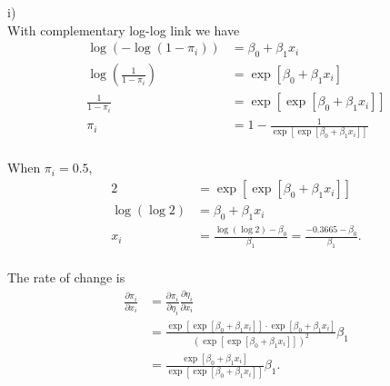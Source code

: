 \documentclass[a4paper]{article}
\begin{document}
i)\\
With complementary log-log link we have
\begin{align*}
\log\left(-\log(1-\pi_{i})\right) &= \beta_{0} + \beta_{1}x_{i}\\
\log\left(\frac{1}{1-\pi_{i}}\right) &= \exp\left[\beta_{0} + \beta_{1}x_{i}\right]\\
\frac{1}{1-\pi_{i}} &= \exp\left[\exp\left[\beta_{0} + \beta_{1}x_{i}\right]\right]\\
\pi_{i} &= 1 - \frac{1}{\exp\left[\exp\left[\beta_{0} + \beta_{1}x_{i}\right]\right]}\\
\end{align*}

When $\pi_{i} = 0.5$,
\begin{align*}
2 &= \exp\left[\exp\left[\beta_{0} + \beta_{1}x_{i}\right]\right]\\
\log\left(\log 2\right) &= \beta_{0} + \beta_{1}x_{i}\\
x_{i} &= \frac{\log\left(\log 2\right) - \beta_{0}}{\beta_{1}} = \frac{-0.3665 -\beta_{0}}{\beta_{1}}.\\
\end{align*}

The rate of change is
\begin{align*}
\frac{\partial \pi_{i}}{\partial x_{i}} &= \frac{\partial \pi_{i}}{\partial \eta_{i}}\frac{\partial \eta_{i}}{\partial x_{i}}\\
&= \frac{\exp\left[\exp\left[\beta_{0} + \beta_{1}x_{i}\right]\right] \cdot \exp\left[\beta_{0} + \beta_{1}x_{i}\right]}{\left(\exp\left[\exp\left[\beta_{0} + \beta_{1}x_{i}\right]\right]\right)^{2}}\beta_{1}\\
&= \frac{\exp\left[\beta_{0} + \beta_{1}x_{i}\right]}{\exp\left[\exp\left[\beta_{0} + \beta_{1}x_{i}\right]\right]}\beta_{1}.
\end{align*}
\end{document}
